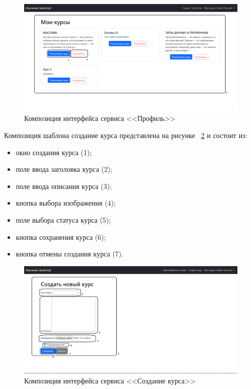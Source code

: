 \begin{figure}[h]
	\centering
	\includegraphics[width=1\linewidth]{images/профиль}
	\caption{Композиция интерфейса сервиса <<Профиль>>}
	\label{templ:image8}
\end{figure}
\newpage

Композиция шаблона создание курса представлена на рисунке ~\ref{templ:image9} и состоит из:

\begin{itemize}
	\item окно создания курса (1);
	\item поле ввода заголовка курса (2);
	\item поле ввода описания курса (3);
	\item кнопка выбора изображения (4);
	\item поле выбора статуса курса (5);
	\item кнопка сохранения курса (6);
	\item кнопка отмены создания курса (7).
\end{itemize}

\begin{figure}[h]
	\centering
	\includegraphics[width=1\linewidth]{images/создатькурс}
	\caption{Композиция интерфейса сервиса <<Создание курса>>}
	\label{templ:image9}
\end{figure}


